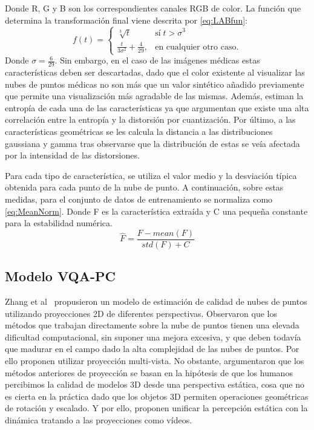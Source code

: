 Donde R, G y B son los correspondientes canales RGB de color. La función que 
determina la transformación final viene descrita por \eqref{eq:LABfun}: 
\begin{equation}
  f(t) = \begin{cases} \sqrt[3]{t} & \textrm{sí}\; t > \sigma^3 \\ 
    \frac{t}{3\sigma^2} + \frac{4}{29},& \textrm{en cualquier otro caso.}
         \end{cases}  
  \label{eq:LABfun}
\end{equation}
Donde $\sigma = \frac{6}{29}$.
Sin embargo, en el caso de las imágenes médicas estas características deben 
ser descartadas, dado que el color existente al visualizar las nubes de puntos 
médicas no son más que un valor sintético añadido previamente que permite 
una visualización más agradable de las mismas. 
Además, estiman la entropía de cada una de las características 
ya que argumentan que existe una alta correlación entre la 
entropía y la distorsión por cuantización. 
Por último, a las características geométricas se les calcula 
la distancia a las distribuciones gaussiana y gamma tras observarse 
que la distribución de estas se veía afectada por la intensidad 
de las distorsiones. 

Para cada tipo de característica, se utiliza el valor medio y la desviación típica 
obtenida para cada punto de la nube de punto. A continuación, sobre estas medidas, 
para el conjunto de datos de entrenamiento se normaliza como \eqref{eq:MeanNorm}.
Donde F es la característica extraída y C una pequeña constante para la 
estabilidad numérica. 
\begin{equation} 
  \hat F = \frac{F-mean(F)}{std(F) + C}
  \label{eq:MeanNorm}
\end{equation}


\subsection{Modelo VQA-PC}
Zhang et al~\cite{VQA-PC} propusieron un modelo de estimación de calidad de nubes 
de puntos utilizando proyecciones 2D de diferentes perspectivas. 
Observaron que los métodos que trabajan directamente sobre la nube de puntos tienen
una elevada dificultad computacional, sin suponer una mejora excesiva, y que 
deben todavía que madurar en el campo dado la alta complejidad de las nubes de puntos.
Por ello proponen utilizar proyección multi-vista. No obstante, argumentaron que 
los métodos anteriores de proyección se basan en la hipótesis de que los humanos 
percibimos la calidad de modelos 3D desde una perspectiva estática, cosa que no 
es cierta en la práctica dado que los objetos 3D permiten operaciones geométricas 
de rotación y escalado.
Y por ello, proponen unificar la percepción estática con la dinámica tratando 
a las proyecciones como vídeos.

